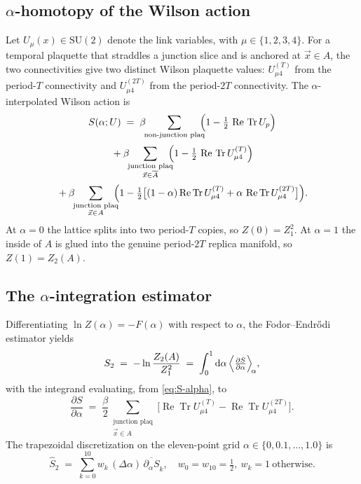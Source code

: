 \documentclass[11pt,a4paper]{article}
\theoremstyle{definition}
\newcommand{\bA}{\overline{A}}
\newcommand{\Tr}{\operatorname{Tr}}
\renewcommand{\Re}{\operatorname{Re}}
\newcommand{\half}{\tfrac{1}{2}}
\newcommand{\dee}{\mathrm{d}}
\newcommand{\SUtwo}{\mathrm{SU}(2)}
\begin{document}
\subsection{$\alpha$-homotopy of the Wilson action}
\label{sec:action}

Let $U_{\mu}(x)\in\SUtwo$ denote the link variables, with $\mu\in
\{1,2,3,4\}$. For a temporal plaquette that straddles a junction slice
and is anchored at $\vec x \in A$, the two connectivities give two
distinct Wilson plaquette values: $U^{(T)}_{\mu 4}$ from the
period-$T$ connectivity and $U^{(2T)}_{\mu 4}$ from the period-$2T$
connectivity. The $\alpha$-interpolated Wilson action is
\begin{multline}
   S(\alpha; U) \;=\;
     \beta \!\!\sum_{\text{non-junction plaq}}\!\!\!
        \Bigl(1 - \half\,\Re\,\Tr U_{p}\Bigr)
   \\[2pt]
   {}+ \beta \!\!\sum_{\substack{\text{junction plaq}\\\vec x\in\bA}}\!\!\!
        \Bigl(1 - \half\,\Re\,\Tr U^{(T)}_{\mu 4}\Bigr)
   \\[2pt]
   {}+ \beta \!\!\sum_{\substack{\text{junction plaq}\\\vec x\in A}}\!\!\!
        \Bigl(1 - \half\bigl[(1-\alpha)\Re\Tr U^{(T)}_{\mu 4}
                            + \alpha\,\Re\Tr U^{(2T)}_{\mu 4}\bigr]\Bigr).
   \label{eq:S-alpha}
\end{multline}
At $\alpha=0$ the lattice splits into two period-$T$ copies, so
$Z(0) = Z_{1}^{2}$. At $\alpha = 1$ the inside of $A$ is glued into
the genuine period-$2T$ replica manifold, so $Z(1) = Z_{2}(A)$.

\subsection{The $\alpha$-integration estimator}
\label{sec:alpha-int}

Differentiating $\ln Z(\alpha) = -F(\alpha)$ with respect to $\alpha$,
the Fodor--Endr\H{o}di estimator \cite{FodorEndrodi2007,EndrodiFodor2007}
yields
\begin{equation}
   S_{2} \;=\; -\ln\frac{Z_{2}(A)}{Z_{1}^{2}}
        \;=\; \int_{0}^{1} \dee\alpha\,
              \Bigl\langle \tfrac{\partial S}{\partial \alpha}\Bigr\rangle_{\!\alpha},
   \label{eq:FE-estimator}
\end{equation}
with the integrand evaluating, from \eqref{eq:S-alpha}, to
\begin{equation}
   \frac{\partial S}{\partial \alpha} \;=\;
   \frac{\beta}{2}\!\!\!\sum_{\substack{\text{junction plaq}\\\vec x\in A}}\!\!\!
        \bigl[\Re\Tr U^{(T)}_{\mu 4} - \Re\Tr U^{(2T)}_{\mu 4}\bigr].
   \label{eq:dS-dalpha}
\end{equation}
The trapezoidal discretization on the eleven-point grid
$\alpha\in\{0,0.1,\ldots,1.0\}$ is
\begin{equation}
   \widehat S_{2} \;=\; \sum_{k=0}^{10} w_{k}\,(\Delta\alpha)\,
                       \overline{\partial_{\alpha}S}_{k},
   \quad w_{0}=w_{10}=\half,\ w_{k}=1\ \text{otherwise}.
   \label{eq:trap-estimator}
\end{equation}
\end{document}
